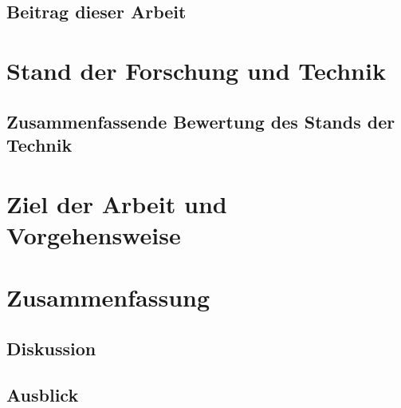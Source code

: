 \documentclass[%
english, ngerman,%
twoside, %
]{isw_smb_diss} %
\numberwithin{equation}{chapter} %
\begin{document}
\section{Beitrag dieser Arbeit}

\chapter{Stand der Forschung und Technik}
\section{Zusammenfassende Bewertung des Stands der Technik}

\chapter{Ziel der Arbeit und Vorgehensweise}



\chapter{Zusammenfassung}
\section{Diskussion}
\section{Ausblick}

\nocite{*}

\setlength{\emergencystretch}{.5em}
\printbibliography[heading=bibintoc]





\end{document}
